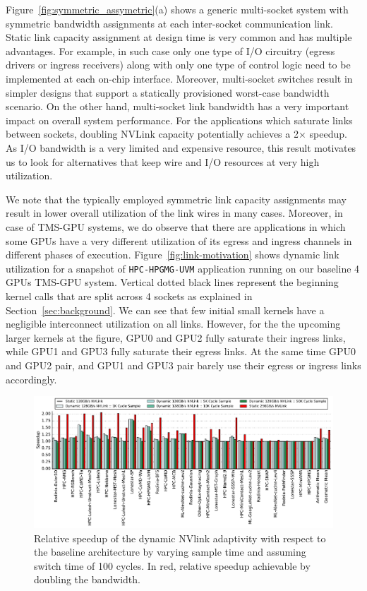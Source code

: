 Figure~\ref{fig:symmetric_assymetric}(a) shows a generic multi-socket system
with symmetric bandwidth assignments at each inter-socket communication link.
Static link capacity assignment at design time is very common and has multiple
advantages. For example, in such case only one type of I/O circuitry (egress
drivers or ingress receivers) along with only one type of control logic need to
be implemented at each on-chip interface. Moreover, multi-socket switches
result in simpler designs that support a statically provisioned worst-case
bandwidth scenario. On the other hand, multi-socket link bandwidth has a very
important impact on overall system performance. For the applications which saturate links between sockets, doubling NVLink capacity potentially achieves a 2$\times$ speedup.
As I/O bandwidth is a very limited and expensive resource, this
result motivates us to look for alternatives that keep wire and I/O resources
at very high utilization. 

We note that the typically employed symmetric link
capacity assignments may result in lower overall utilization of the link wires
in many cases. Moreover, in case of TMS-GPU systems, we do observe that there
are applications in which some GPUs have a very different utilization of its
egress and ingress channels in different phases of execution.
Figure~\ref{fig:link-motivation} shows dynamic link utilization for a snapshot
of \texttt{HPC-HPGMG-UVM} application running on our baseline 4 GPUs TMS-GPU
system. Vertical dotted black lines represent the beginning kernel calls that
are split across 4 sockets as explained in Section~\ref{sec:background}. We can see
that few initial small kernels have a negligible interconnect
utilization on all links. However, for the the upcoming larger kernels at the
figure, GPU0 and GPU2 fully saturate their ingress links, while GPU1 and GPU3
fully saturate their egress links. At the same time GPU0 and GPU2 pair,
and GPU1 and GPU3 pair barely use their egress or ingress links accordingly.

\begin{figure}[tp]
    \centering
    \includegraphics[width=1.0\textwidth]{figures/plot_nvlink_sample_time.pdf}
    \caption{Relative speedup of the dynamic NVlink adaptivity with respect to
	the baseline architecture by varying sample time and assuming switch time of
	100 cycles. In red, relative speedup achievable by doubling the bandwidth.}
    \label{fig:sampletime}
\end{figure}

